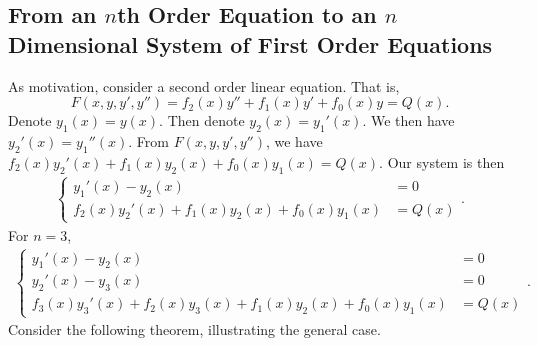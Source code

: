     \subsection{From an \(n\)th Order Equation to an \(n\) Dimensional System of First Order Equations}

        As motivation, consider a second order linear equation. That is,
        \begin{equation*}
            F(x,y,y',y'')=f_2(x)y''+f_1(x)y'+f_0(x)y=Q(x).
        \end{equation*}
        Denote \(y_1(x)=y(x)\). Then denote \(y_2(x)=y_1'(x)\). We then have \(y_2'(x)=y_1''(x)\). From \(F(x,y,y',y'')\), we have \(f_2(x)y_2'(x)+f_1(x)y_2(x)+f_0(x)y_1(x)=Q(x)\). Our system is then
        \begin{align*}
            \begin{cases}
                y_1'(x)-y_2(x)&=0 \\
                f_2(x)y_2'(x)+f_1(x)y_2(x)+f_0(x)y_1(x)&=Q(x)
            \end{cases}.
        \end{align*}
        For \(n=3\), 
        \begin{align*}
            \begin{cases}
                y_1'(x)-y_2(x)&=0 \\
                y_2'(x)-y_3(x)&=0 \\
                f_3(x)y_3'(x)+f_2(x)y_3(x)+f_1(x)y_2(x)+f_0(x)y_1(x)&=Q(x)
            \end{cases}.
        \end{align*}
        Consider the following theorem, illustrating the general case.
